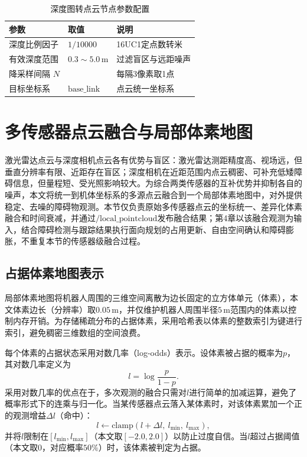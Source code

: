\begin{table}[!htb]
    \centering
    \caption{深度图转点云节点参数配置}
    \label{tab:depth_params}
    \renewcommand{\arraystretch}{1.4}
    \begin{tabularx}{0.92\textwidth}{>{\arraybackslash}X >{\centering\arraybackslash}p{3.2cm} >{\arraybackslash}X}
        \toprule[1.2pt]
        \textbf{参数} & \textbf{取值} & \textbf{说明} \\
        \midrule
        深度比例因子 & $1/10000$ & 16UC1定点数转米 \\
        有效深度范围 & $0.3\sim5.0$\,m & 过滤盲区与远距噪声 \\
        降采样间隔 $N$ & 3 & 每隔3像素取1点 \\
        目标坐标系 & $\mathrm{base\_link}$ & 点云统一坐标系 \\
        \bottomrule[1.2pt]
    \end{tabularx}
\end{table}

\section{多传感器点云融合与局部体素地图}
\label{sec:voxelmap}
激光雷达点云与深度相机点云各有优势与盲区：激光雷达测距精度高、视场远，但垂直分辨率有限、近距存在盲区；深度相机在近距范围内点云稠密、可补充低矮障碍信息，但量程短、受光照影响较大。为综合两类传感器的互补优势并抑制各自的噪声，本文将统一到机体坐标系的多源点云融合到一个局部体素地图中，对外提供稳定、去噪的障碍物观测。本节仅负责原始多传感器点云的坐标统一、差异化体素融合和时间衰减，并通过$\mathrm{/local\_pointcloud}$发布融合结果；第4章以该融合观测为输入，结合障碍检测与跟踪结果执行面向规划的占用更新、自由空间确认和障碍膨胀，不重复本节的传感器级融合过程。

\subsection{占据体素地图表示}
局部体素地图将机器人周围的三维空间离散为边长固定的立方体单元（体素），本文体素边长（分辨率）取$0.05\,\mathrm{m}$，并仅维护机器人周围半径$5\,\mathrm{m}$范围内的体素以控制内存开销。为存储稀疏分布的占据体素，采用哈希表以体素的整数索引为键进行索引，避免稠密三维数组的空间浪费。

每个体素的占据状态采用对数几率（log-odds）表示。设体素被占据的概率为$p$，其对数几率定义为
\begin{equation}
    l = \log\frac{p}{1-p}.
    \label{eq:log_odds}
\end{equation}
采用对数几率的优点在于，多次观测的融合只需对$l$进行简单的加减运算，避免了概率形式下的连乘与归一化。当某传感器点云落入某体素时，对该体素累加一个正的观测增益$\Delta l$（命中）：
\begin{equation}
    l \leftarrow \mathrm{clamp}(l + \Delta l,\ l_{\min},\ l_{\max}),
    \label{eq:log_odds_update}
\end{equation}
并将$l$限制在$[l_{\min}, l_{\max}]$（本文取$[-2.0, 2.0]$）以防止过度自信。当$l$超过占据阈值（本文取$0$，对应概率$50\%$）时，该体素被判定为占据。

